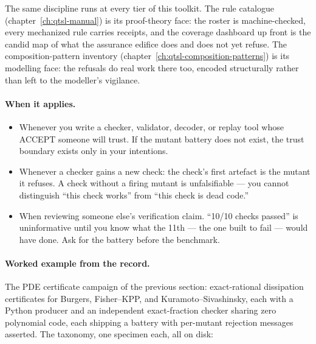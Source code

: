 The same discipline runs at every tier of this toolkit. The rule
catalogue (chapter~\ref{ch:qtsl-manual}) is its proof-theory face: the
roster is machine-checked, every mechanized rule carries receipts, and
the coverage dashboard up front is the candid map of what the assurance
edifice does and does not yet refuse. The composition-pattern inventory
(chapter~\ref{ch:qtsl-composition-patterns}) is its modelling face: the
refusals do real work there too, encoded structurally rather than
left to the modeller's vigilance.

\paragraph{When it applies.}
\begin{itemize}
\item Whenever you write a checker, validator, decoder, or replay tool
  whose ACCEPT someone will trust. If the mutant battery does not
  exist, the trust boundary exists only in your intentions.
\item Whenever a checker gains a new check: the check's first artefact
  is the mutant it refuses. A check without a firing mutant is
  unfalsifiable --- you cannot distinguish ``this check works'' from
  ``this check is dead code.''
\item When reviewing someone else's verification claim. ``10/10 checks
  passed'' is uninformative until you know what the 11th --- the one
  built to fail --- would have done. Ask for the battery before the
  benchmark.
\end{itemize}

\paragraph{Worked example from the record.} The PDE certificate
campaign of the previous section: exact-rational dissipation
certificates for Burgers, Fisher--KPP, and Kuramoto--Sivashinsky, each
with a Python producer and an independent exact-fraction checker
sharing zero polynomial code, each shipping a battery with per-mutant
rejection messages asserted. The taxonomy, one specimen each, all on
disk:

